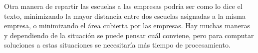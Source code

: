 \documentclass{article}
\begin{document}
Otra manera de repartir las escuelas a las empresas podría ser como lo dice el texto, minimizando la mayor distancia entre dos escuelas asignadas a la misma empresa, o minimizando el área cubierta por las empresas. Hay muchas maneras y dependiendo de la situación se puede pensar cuál conviene, pero para computar soluciones a estas situaciones se necesitaría más tiempo de procesamiento.
\end{document}
